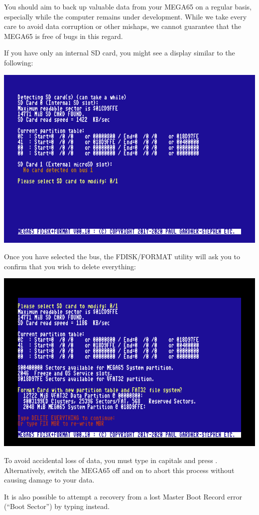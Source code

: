 You should aim to back up valuable data from your
MEGA65 on a regular basis, especially while the computer remains under
development.  While we take every care to avoid data corruption or
other mishaps, we cannot guarantee that the MEGA65 is free of bugs in
this regard.

If you have only an internal SD card, you might see a
display similar to the following:

\begin{center}
\includegraphics[width=0.7\linewidth]{images/ss-m65fdisk-busselect.png}
\end{center}

Once you have selected the bus, the FDISK/FORMAT utility will ask you to confirm that you wish to delete everything:

\begin{center}
\includegraphics[width=0.7\linewidth]{images/ss-m65fdisk-typesomething.png}
\end{center}

To avoid accidental loss of data, you must type  in capitals and press . Alternatively, switch the MEGA65 off and on to abort this process without causing damage to your data.

It is also possible to attempt a recovery from a lost Master Boot Record error (``Boot Sector'') by typing  instead.

